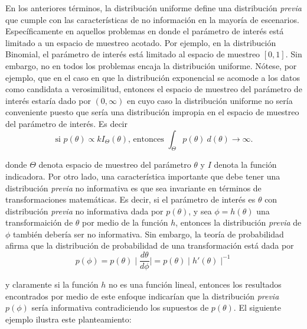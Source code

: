 En los anteriores términos, la distribución uniforme define una distribución \emph{previa} que cumple con las características de no información en la mayoría de escenarios. Específicamente en aquellos problemas en donde el parámetro de interés está limitado a un espacio de muestreo acotado. Por ejemplo, en la distribución Binomial, el parámetro de interés está limitado al espacio de muestreo $[0,1]$. Sin embargo, no en todos los problemas encaja la distribución uniforme. Nótese, por ejemplo, que en el caso en que la distribución exponencial se acomode a los datos como candidata a verosimilitud, entonces el espacio de muestreo del parámetro de interés estaría dado por $(0,\infty)$ en cuyo caso la distribución uniforme no sería conveniente puesto que sería una distribución impropia en el espacio de muestreo del parámetro de interés. Es decir
\begin{equation*}
\text{si } p(\theta)\propto kI_{\Theta}(\theta) \text{, entonces } \int_{\Theta}p(\theta) \ d(\theta)\longrightarrow \infty.
\end{equation*}

donde $\Theta$ denota espacio de muestreo del parámetro $\theta$ y $I$ denota la función indicadora. Por otro lado, una característica importante que debe tener una distribución \emph{previa} no informativa es que sea invariante en términos de transformaciones matemáticas. Es decir, si el parámetro de interés es $\theta$ con distribución \emph{previa} no informativa dada por $p(\theta)$, y sea $\phi=h(\theta)$ una transformaición de $\theta$ por medio de la función $h$, entonces la distribución \emph{previa} de $\phi$ también debería ser no informativa. Sin embargo, la teoría de probabilidad afirma que la distribución de probabilidad de una transformación está dada por
\begin{equation}\label{teo_transf}
p(\phi)=p(\theta) \mid \frac{d\theta}{d\phi} \mid =p(\theta) \mid h'(\theta) \mid ^{-1}
\end{equation}

y claramente si la función $h$ no es una función lineal, entonces los resultados encontrados por medio de este enfoque indicarían que la distribución \emph{previa} $p(\phi)$ sería informativa contradiciendo los supuestos de $p(\theta)$. El siguiente ejemplo ilustra este planteamiento:

